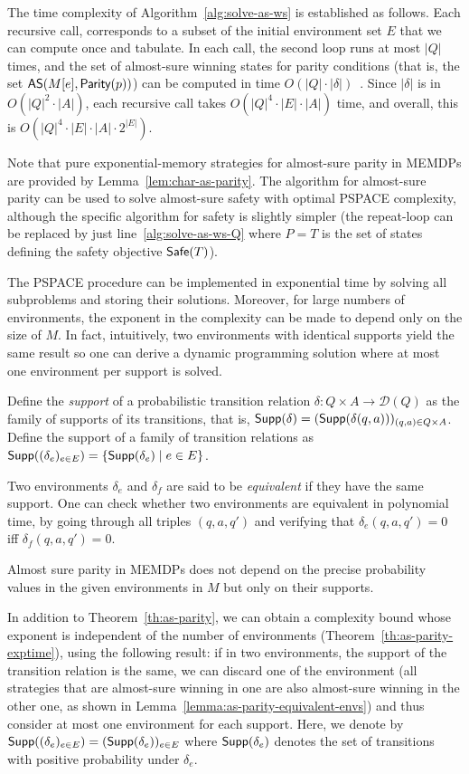 \documentclass[a4paper,USenglish,cleveref, autoref, thm-restate]{lipics-v2021}
\def\abs#1{\ensuremath{\lvert #1 \rvert}}
\newcommand\Supp{\textrm{\sf Supp}}
\newcommand\almostsure{\textrm{\sf AS}}
\newcommand\Safe{\textrm{\sf Safe}}
\newcommand\Parity{\textrm{\sf Parity}}
\newcommand\D{\mathcal{D}}
\begin{document}
The time complexity of Algorithm~\ref{alg:solve-as-ws} is established as follows. 
Each recursive call, corresponds to a subset of the initial environment set $E$ that we can compute once and tabulate.
In each call, the second loop runs at most $\abs{Q}$ times,
and the set of almost-sure winning states for parity conditions (that is, the set $\almostsure(M[e],\Parity(p))$) can be computed in time $O(\abs{Q}\cdot \abs{\delta})$~\cite{BK08}.
Since $\abs{\delta}$ is in $O(\abs{Q}^2\cdot\abs{A})$,
each recursive call takes $O(\abs{Q}^4\cdot\abs{E}\cdot\abs{A})$ time,
and overall, this is $O(\abs{Q}^4\cdot\abs{E}\cdot\abs{A}\cdot 2^{\abs{E}})$.


Note that pure exponential-memory strategies for almost-sure parity in MEMDPs are provided
by Lemma~\ref{lem:char-as-parity}.
The algorithm for almost-sure parity can be used to solve almost-sure safety
with optimal PSPACE complexity, although the specific algorithm for safety
is slightly simpler (the repeat-loop can be replaced by just line~\ref{alg:solve-as-ws-Q}
where $P = T$ is the set of states defining the safety objective $\Safe(T)$).
 
The PSPACE procedure can be implemented in exponential time by solving
all subproblems and storing their solutions. Moreover,
for large numbers of environments, the exponent in the complexity can be made to depend only on the size of $M$. In fact, intuitively, two environments with identical supports yield the same result so one can derive a dynamic programming solution where at most one environment per support is solved.

Define the \emph{support} of a probabilistic transition relation $\delta : Q\times A \rightarrow \D(Q)$
as the family of supports of its transitions, that is, $\Supp(\delta) = (\Supp(\delta(q,a)))_{(q,a) \in Q\times A}$.
Define the support of a family of transition relations
as $\Supp((\delta_e)_{e \in E}) = \{ \Supp(\delta_e) \mid e  \in E\}$.

Two environments $\delta_e$ and $\delta_f$ are said to be \emph{equivalent} if they have the same support.
One can check whether two environments are equivalent in polynomial time,
by going through all triples $(q,a,q')$ and verifying that $\delta_e(q,a,q')= 0$
iff $\delta_f(q,a,q')=0$.

Almost sure parity in MEMDPs does not depend on the precise probability values in the given environments in $M$ but only on their supports.


In addition to Theorem~\ref{th:as-parity}, we can obtain a complexity bound whose exponent
is independent of the number of environments (Theorem~\ref{th:as-parity-exptime}),
using the following result: if in two
environments, the support of the transition relation is the same, 
we can discard one of the environment (all strategies that are almost-sure winning
in one are also almost-sure winning in the other one, as shown in Lemma~\ref{lemma:as-parity-equivalent-envs}) 
and thus consider at most one environment for each support.
Here, we denote by $\Supp((\delta_e)_{e \in E}) = (\Supp(\delta_e))_{e \in E}$ where $\Supp(\delta_e)$ denotes the set of transitions with positive probability under $\delta_e$.
\end{document}
